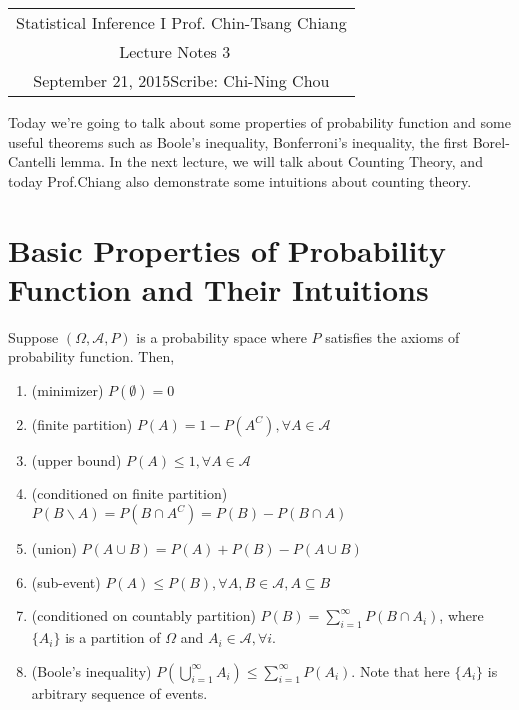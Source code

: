 \documentclass[11pt]{article}
\newcommand{\scribe}{Chi-Ning Chou}
\newcommand{\lecnum}{3}
\newcommand{\lecdate}{September 21, 2015}
\begin{document}
	
	\begin{center}
		\renewcommand{\arraystretch}{2}
		\begin{bfseries}
			\begin{tabular}{|c|}
				\hline
				Statistical Inference I \hfill Prof. Chin-Tsang Chiang\\
				\hspace{15em} {\large Lecture Notes \lecnum} \hspace{15em}\ \\
				\lecdate \hfill Scribe: \scribe\\
				\hline
			\end{tabular}
			\renewcommand{\arraystretch}{1}
		\end{bfseries}
	\end{center}
	
Today we're going to talk about some properties of probability function and some useful theorems such as Boole's inequality, Bonferroni's inequality, the first Borel-Cantelli lemma. In the next lecture, we will talk about Counting Theory, and today Prof.Chiang also demonstrate some intuitions about counting theory.

\section{Basic Properties of Probability Function and Their Intuitions}
\begin{theorem}
	Suppose $(\Omega,\mathcal{A},P)$ is a probability space where $P$ satisfies the axioms of probability function. Then,
	\begin{enumerate}
		\item (minimizer) $P(\emptyset) = 0$
		\item (finite partition) $P(A) = 1-P(A^C), \forall A\in\mathcal{A}$
		\item (upper bound) $P(A)\leq1, \forall A\in\mathcal{A}$
		\item (conditioned on finite partition) $P(B\backslash A) = P(B\cap A^C) = P(B) - P(B\cap A)$
		\item (union) $P(A\cup B) = P(A) + P(B) - P(A\cup B)$
		\item (sub-event) $P(A)\leq P(B),\forall A,B\in\mathcal{A},A\subseteq B$
		\item (conditioned on countably partition) $P(B) = \sum_{i=1}^{\infty} P(B\cap A_i)$, where $\{A_i\}$ is a partition of $\Omega$ and $A_i\in\mathcal{A},\forall i$.
		\item (Boole's inequality) $P(\bigcup_{i=1}^{\infty}A_i)\leq\sum_{i=1}^{\infty}P(A_i)$. Note that here $\{A_i\}$ is arbitrary sequence of events.
	\end{enumerate}
\end{theorem}
\end{document}

